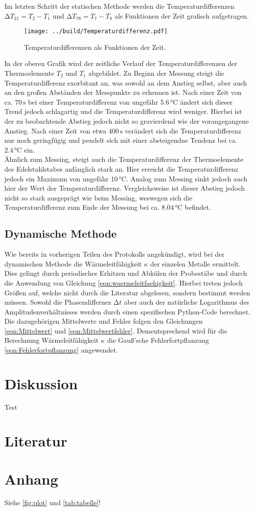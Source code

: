 Im letzten Schritt der statischen Methode werden die Temperaturdifferenzen $\increment T_{21} = T_2 - T_1$ und
$\increment T_{78} = T_7 - T_8$
als Funktionen der Zeit grafisch aufgetragen.

\begin{figure}
  \centering
  \texttt{[image: ../build/Temperaturdifferenz.pdf]}
  \caption{Temperaturdifferenzen als Funktionen der Zeit.}
  \label{fig:statisch3}
\end{figure}

In der oberen Grafik wird der zeitliche Verlauf der Temperaturdifferenzen der Thermoelemente $T_2$ und $T_1$ abgebildet.
Zu Beginn der Messung steigt die Temperaturdifferenz exorbitant an, was sowohl an dem Anstieg selbst, aber auch an den 
großen Abständen der Messpunkte zu erkennen ist. Nach einer Zeit von ca. $70\,\unit{\second}$ bei einer Temperaturdifferenz von ungefähr 5.6\,\unit{\celsius} ändert sich dieser Trend jedoch
schlagartig und die Temperaturdifferenz wird weniger. Hierbei ist der zu beobachtende Abstieg jedoch nicht so gravierdend wie
der vorangegangene Anstieg. Nach einer Zeit von etwa 400\,$\unit{\second}$ verändert sich die Temperaturdifferenz nur noch 
geringfügig und pendelt sich mit einer absteigendne Tendenz bei ca.$2.4\,\unit{\celsius}$ ein.\\
Ähnlich zum Messing, steigt auch die Temperaturdifferenz der Thermoelemente des Edelstahlstabes anfänglich stark an. Hier erreicht die 
Temperaturdifferenz jedoch ein Maximum von ungefähr 10\,$\unit{\celsius}$. Analog zum Messing sinkt jedoch auch hier der Wert der 
Temperaturdifferenz. Vergleichsweise ist dieser Abstieg jedoch nicht so stark ausgeprägt wie beim Messing, weswegen sich die Temperaturdifferenz
zum Ende der Messung bei ca. $8.04\,\unit{\celsius}$ befindet.

\subsection{Dynamische Methode}

Wie bereits in vorherigen Teilen des Protokolls angekündigt, wird bei der dynamischen Methode die Wärmeleitfähigkeit $\kappa$ der einzelen Metalle
ermittelt. Dies gelingt durch periodisches Erhitzen und Abkülen der Probestäbe und durch die Anwendung von Gleichung \eqref{eqn:waermeleitfaehigkeit}.
Hierbei treten jedoch Größen auf, welche nicht durch die Literatur abgelesen, sondern bestimmt werden müssen. Sowohl die Phasendiffernez $\increment t$
aber auch der natürliche Logarithmus des Amplitudenverhältnisses werden durch einen spezifischen Python-Code berechnet. Die dazugehörigen Mittelwerte und
Fehler folgen den Gleichungen \eqref{eqn:Mittelwert} und \eqref{eqn:Mittelwertfehler}. Dementsprechend wird für die Berechnung Wärmeleitfähigkeit $\kappa$
die Gauß'sche Fehlerfortpflanzung \eqref{eqn:Fehlerfortpflanzung} angewendet. 

\section{Diskussion}
Test
\section{Literatur}

\section{Anhang}
Siehe \autoref{fig:plot} und \autoref{tab:tabelle}!


